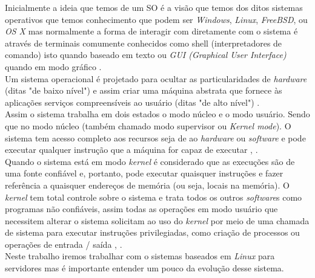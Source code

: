 Inicialmente a ideia que temos de um SO é a visão que temos dos ditos sistemas operativos que temos conhecimento que podem ser \emph{Windows}, \emph{Linux}, \emph{FreeBSD}, ou \emph{OS X} mas normalmente a forma de interagir com diretamente com o sistema é através de terminais comumente conhecidos como shell (interpretadores de comando) isto quando baseado em texto ou \emph{GUI (Graphical User Interface)} quando em modo gráfico \cite{Tanenbaum2016}.\\
Um sistema operacional é projetado para ocultar as particularidades de \emph{hardware} (ditas "de baixo nível") e assim criar uma máquina abstrata que fornece às aplicações serviços compreensíveis ao usuário (ditas "de alto nível") \cite{Comer2012}.\\
Assim o sistema trabalha em dois estados o modo núcleo e o modo usuário. Sendo que no modo núcleo (também chamado modo supervisor ou \emph{Kernel mode}). O sistema tem acesso completo aos recursos seja de ao \emph{hardware} ou \emph{software} e pode executar qualquer instrução que a máquina for capaz de executar \cite{Tanenbaum2016}, \cite{linfo2007}.\\
Quando o sistema está em modo \emph{kernel} é considerado que as execuções são de uma fonte confiável e, portanto, pode executar quaisquer instruções e fazer referência a quaisquer endereços de memória (ou seja, locais na memória). O \emph{kernel} tem total controle sobre o sistema e trata todos os outros \emph{software}s como programas não confiáveis, assim todas as operações em modo usuário que necessitem alterar o sistema solicitam ao uso do \emph{kernel} por meio de uma chamada de sistema  para executar instruções privilegiadas, como criação de processos ou operações de entrada / saída \cite{Tanenbaum2016}, \cite{linfo2007}.\\

Neste trabalho iremos trabalhar com o sistemas baseados em \emph{Linux} para servidores mas é importante entender um pouco da evolução desse sistema.


